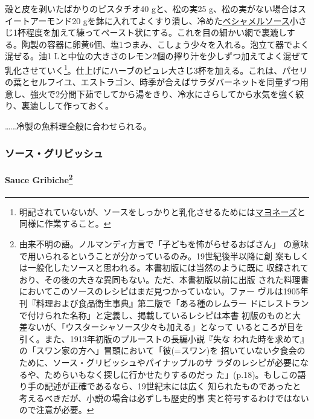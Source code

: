 \begin{recette}
殻と皮を剥いたばかりのピスタチオ40 gと、松の実25
g、松の実がない場合はスイートアーモンド20
gを鉢に入れてよくすり潰し、冷めた\protect\hyperlink{sauce-bechamel}{ベシャメルソース}小さじ1杯程度を加えて練ってペースト状にする。これを目の細かい網で裏漉しする。陶製の容器に卵黄6個、塩1つまみ、こしょう少々を入れる。泡立て器でよく混ぜる。油1
Lと中位の大きさのレモン2個の搾り汁を少しずつ加えてよく混ぜて乳化させていく\footnote{明記されていないが、ソースをしっかりと乳化させるためには\protect\hyperlink{mayonnaise}{マヨネーズ}と同様に作業すること。}。仕上げにハーブのピュレ大さじ3杯を加える。これは、パセリの葉とセルフイユ、エストラゴン、時季が合えばサラダバーネットを同量ずつ用意し、強火で2分間下茹でしてから湯をきり、冷水にさらしてから水気を強く絞り、裏漉しして作っておく。

\ldots{}\ldots{}冷製の魚料理全般に合わせられる。

\maeaki

\hypertarget{ux30bdux30fcux30b9ux30b0ux30eaux30d3ux30c3ux30b7ux30e5}{%
\subsubsection{ソース・グリビッシュ}\label{ux30bdux30fcux30b9ux30b0ux30eaux30d3ux30c3ux30b7ux30e5}}

\hypertarget{sauce-gribiche13}{%
\paragraph[Sauce Gribiche]{\texorpdfstring{Sauce Gribiche\footnote{由来不明の語。ノルマンディ方言で「子どもを怖がらせるおばさん」
  の意味で用いられるということが分かっているのみ。19世紀後半以降に創
  案もしくは一般化したソースと思われる。本書初版には当然のように既に
  収録されており、その後の大きな異同もない。ただ、本書初版以前に出版
  された料理書においてこのソースのレシピはまだ見つかっていない。ファー
  ヴルは1905年刊『料理および食品衛生事典』第二版で「ある種のレムラー
  ドにレストランで付けられた名称」と定義し、掲載しているレシピは本書
  初版のものと大差ないが、「ウスターシャソース少々も加える」となって
  いるところが目を引く。また、1913年初版のプルーストの長編小説『失な
  われた時を求めて』の「スワン家の方へ」冒頭において「彼(=スワン)を
  招いていない夕食会のために、ソース・グリビッシュやパイナップルのサ
  ラダのレシピが必要になるや、ためらいもなく探しに行かせたりするのだっ
  た」(p.18)。もしこの語り手の記述が正確であるなら、19世紀末には広く
  知られたものであったと考えるべきだが、小説の場合は必ずしも歴史的事
  実と符号するわけではないので注意が必要。}}{Sauce Gribiche}}\label{sauce-gribiche13}}


\end{recette}
